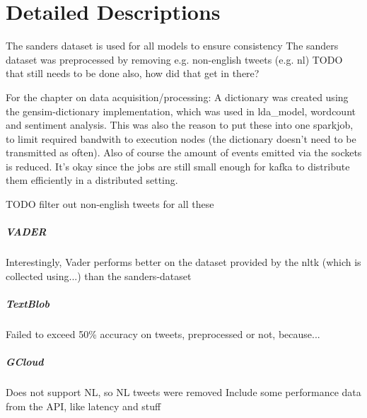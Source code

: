 \chapter{Detailed Descriptions}
\label{chapter:DetailedDescriptions}\label{sentimentanalysis}

The sanders dataset is used for all models to ensure consistency
The sanders dataset was preprocessed by removing e.g. non-english tweets (e.g. nl)
TODO that still needs to be done
also, how did that get in there?

For the chapter on data acquisition/processing: A dictionary was created using the gensim-dictionary implementation, which was used in lda_model, wordcount and sentiment analysis.
This was also the reason to put these into one sparkjob, to limit required bandwith to execution nodes (the dictionary doesn't need to be transmitted as often).
Also of course the amount of events emitted via the sockets is reduced.
It's okay since the jobs are still small enough for kafka to distribute them efficiently in a distributed setting.



TODO filter out non-english tweets for all these

\paragraph{VADER}
Interestingly, Vader performs better on the dataset provided by the nltk (which is collected using...) than the sanders-dataset

\paragraph{TextBlob}
Failed to exceed 50\% accuracy on tweets, preprocessed or not, because...

\paragraph{GCloud}
Does not support NL, so NL tweets were removed
Include some performance data from the API, like latency and stuff

\newpage
